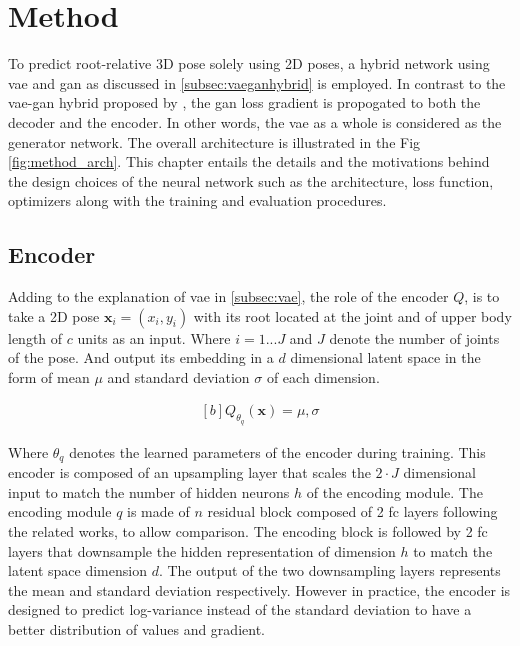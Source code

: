 \chapter{Method}
\label{chap:method}

To predict root-relative 3D pose solely using 2D poses, a hybrid network using \ac{vae} and \ac{gan} as discussed in \ref{subsec:vaeganhybrid} is employed. In contrast to the \ac{vae}-\ac{gan} hybrid proposed by \cite{autoencoding_beyond_pixels}, the \ac{gan} loss gradient is propogated to both the decoder and the encoder. In other words, the \ac{vae} as a whole is considered as the generator network. The overall architecture is illustrated in the Fig \ref{fig:method_arch}. This chapter entails the details and the motivations behind the design choices of the neural network such as the architecture, loss function, optimizers along with the training and evaluation procedures.

\section{Encoder}
Adding to the explanation of \ac{vae} in \ref{subsec:vae}, the role of the encoder $Q$, is to take a 2D pose $\textbf{x}_i = (x_i, y_i)$ with its root located at the joint and of upper body length of $c$ units as an input. Where $i = 1 ... J$ and $J$ denote the number of joints of the pose. And output its embedding in a $d$ dimensional latent space in the form of mean $\mu$ and standard deviation $\sigma$ of each dimension.

\begin{equation} \label{eqn:Q_fn}
    \begin{gathered}[b]
        Q_{\theta_q}(\textbf{x}) = \mu, \sigma
    \end{gathered}
\end{equation}

Where $\theta_q$ denotes the learned parameters of the encoder during training. This encoder is composed of an upsampling layer that scales the $2\!\cdot\!J$ dimensional input to match the number of hidden neurons $h$ of the encoding module. The encoding module $q$ is made of $n$ residual block composed of 2 \ac{fc} layers following the related works, to allow comparison. The encoding block is followed by 2 \ac{fc} layers that downsample the hidden representation of dimension $h$ to match the latent space dimension $d$. The output of the two downsampling layers represents the mean and standard deviation respectively. However in practice, the encoder is designed to predict log-variance instead of the standard deviation to have a better distribution of values and gradient.

